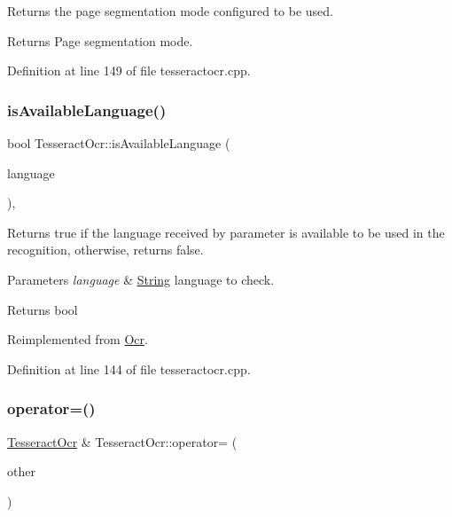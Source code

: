 Returns the page segmentation mode configured to be used. 

\begin{DoxyReturn}{Returns}
Page segmentation mode. 
\end{DoxyReturn}


Definition at line 149 of file tesseractocr.\+cpp.

\mbox{\label{classTesseractOcr_aefe201ace3b144cb8834931b57f79bfd}} 
\subsubsection{\texorpdfstring{is\+Available\+Language()}{isAvailableLanguage()}}
{\footnotesize\ttfamily bool Tesseract\+Ocr\+::is\+Available\+Language (\begin{DoxyParamCaption}\item[{const Q\+String \&}]{language }\end{DoxyParamCaption})\hspace{0.3cm}{\ttfamily [override]}, {\ttfamily [virtual]}}



Returns true if the language received by parameter is available to be used in the recognition, otherwise, returns false. 


\begin{DoxyParams}{Parameters}
{\em language} & \mbox{\hyperlink{classString}{String}} language to check. \\
\hline
\end{DoxyParams}
\begin{DoxyReturn}{Returns}
bool 
\end{DoxyReturn}


Reimplemented from \mbox{\hyperlink{classOcr_a0c9ebb9b531bdcd6789d4bf9cffb1d42}{Ocr}}.



Definition at line 144 of file tesseractocr.\+cpp.

\mbox{\label{classTesseractOcr_ae1327017072b55801ce9ebdbab956b6a}} 
\subsubsection{\texorpdfstring{operator=()}{operator=()}}
{\footnotesize\ttfamily \mbox{\hyperlink{classTesseractOcr}{Tesseract\+Ocr}} \& Tesseract\+Ocr\+::operator= (\begin{DoxyParamCaption}\item[{const \mbox{\hyperlink{classTesseractOcr}{Tesseract\+Ocr}} \&}]{other }\end{DoxyParamCaption})}




